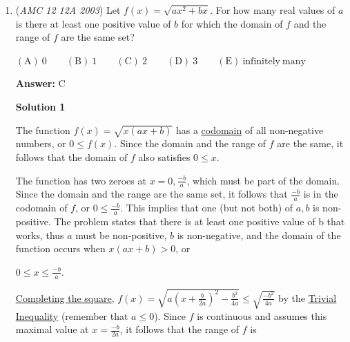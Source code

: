 \begin{enumerate}
 Note that the maximum occurs when $a=b$.

 



\textbf{Solution 2 (Calculus)}

By the logarithmic rules, we have $2-(\log_a{b}+\frac{1}{\log_a{b}})$.Let $x=\log_a{b}$. Thus, the expression becomes $2-(x+\frac{1}{x})$. We want to find the maximum of the function. To do so, we will find its derivative and let it equal to 0. We get: $\frac{d}{dx}\big(2-(x+\frac{1}{x})\big)=\frac{d}{dx}\big(2-x-\frac{1}{x})=-1+x^{-2}=0 \implies \frac{1}{x^2}=1, x^2=1, x=\pm1.$Since $a\geq b>1, x=-1$ is not a solution. Thus, $x=1$. Substituting it into the original expression $2-(x+\frac{1}{x})$, we get $2-(1+\frac{1}{1})=2-2=\boxed{0}$.

 -MistyMathMusic

 


	\item (\textit{AMC 12 12A 2003}) Let $f(x)= \sqrt{ax^2+bx}$.  For how many real values of $a$ is there at least one positive value of $b$ for which the domain of $f$ and the range of $f$ are the same set?


 $\mathrm{(A) \ 0 } \qquad \mathrm{(B) \ 1 } \qquad \mathrm{(C) \ 2 } \qquad \mathrm{(D) \ 3 } \qquad \mathrm{(E) \ \mathrm{infinitely \ many} }$

 \textbf{Answer: }C



\textbf{Solution 1}

The function $f(x) = \sqrt{x(ax+b)}$ has a \href{https://artofproblemsolving.com/wiki/index.php?title=Codomain}{codomain} of all non-negative numbers, or $0 \le f(x)$. Since the domain and the range of $f$ are the same, it follows that the domain of $f$ also satisfies $0 \le x$.

 The function has two zeroes at $x = 0, \frac{-b}{a}$, which must be part of the domain. Since the domain and the range are the same set, it follows that $\frac{-b}{a}$ is in the codomain of $f$, or $0 \le \frac{-b}{a}$. This implies that one (but not both) of $a,b$ is non-positive. The problem states that there is at least one positive value of b that works, thus $a$ must be non-positive, $b$ is non-negative, and the domain of the function occurs when $x(ax+b) > 0$, or 

 $0 \le x \le \frac{-b}{a}.$

 \href{https://artofproblemsolving.com/wiki/index.php?title=Completing\_the\_square}{Completing the square}, $f(x) = \sqrt{a\left(x + \frac{b}{2a}\right)^2 - \frac{b^2}{4a}} \le \sqrt{\frac{-b^2}{4a}}$ by the \href{https://artofproblemsolving.com/wiki/index.php?title=Trivial\_Inequality}{Trivial Inequality} (remember that $a \le 0$). Since $f$ is continuous and assumes this maximal value at $x = \frac{-b}{2a}$, it follows that the range of $f$ is 


\end{enumerate}
